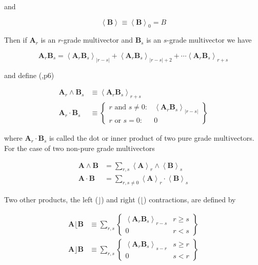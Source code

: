 \documentclass[12pt]{report}
\newcommand{\bm}[1]{\boldsymbol{#1}}
\newcommand{\llt}{\left <}
\newcommand{\rgt}{\right >}
\newcommand{\abs}[1]{\left |{#1}\right |}
\newcommand{\W}{\wedge}
\newcommand{\proj}[2]{\llt {#1} \rgt_{#2}}
\newcommand{\braces}[1]{\left \{ {#1} \right \}}
\begin{document}
and

   \begin{equation}
      \proj{\bm{B}}{} \equiv \proj{\bm{B}}{0} = B
   \end{equation}

Then if $\bm{A}_{r}$ is an $r$-grade multivector and $\bm{B}_{s}$ is an $s$-grade multivector we have

   \begin{equation}
      \bm{A}_{r}\bm{B}_{s} = \proj{\bm{A}_{r}\bm{B}_{s}}{\abs{r-s}}+\proj{\bm{A}_{r}\bm{B}_{s}}{\abs{r-s}+2}+\cdots
                             \proj{\bm{A}_{r}\bm{B}_{s}}{r+s}
   \end{equation}

and define (\cite{Hestenes},p6)

   \begin{align}
      \bm{A}_{r}\W\bm{B}_{s} &\equiv \proj{\bm{A}_{r}\bm{B}_{s}}{r+s} \\
      \bm{A}_{r}\cdot\bm{B}_{s} &\equiv \braces{ \begin{array}{cc}
      r\mbox{ and }s \ne 0: & \proj{\bm{A}_{r}\bm{B}_{s}}{\abs{r-s}}  \\
      r\mbox{ or }s = 0: & 0 \end{array}}
   \end{align}

where $\bm{A}_{r}\cdot\bm{B}_{s}$ is called the dot or inner product of
two pure grade multivectors.  For the case of two non-pure grade multivectors

   \begin{align}
      \bm{A}\W\bm{B} &= \sum_{r,s}\proj{\bm{A}}{r}\W\proj{\bm{B}}{{s}} \\
      \bm{A}\cdot\bm{B} &= \sum_{r,s\ne 0}\proj{\bm{A}}{r}\cdot\proj{\bm{B}}{{s}}
   \end{align}

Two other products, the left ($\rfloor$) and right ($\lfloor$) contractions, are defined by

   \begin{align}
      \bm{A}\lfloor\bm{B} &\equiv \sum_{r,s}\braces{\begin{array}{cc} \proj{\bm{A}_r\bm{B}_{s}}{r-s} & r \ge s \\
                                                  0                                               & r < s \end{array}}  \\
      \bm{A}\rfloor\bm{B} &\equiv \sum_{r,s}\braces{\begin{array}{cc} \proj{\bm{A}_{r}\bm{B}_{s}}{s-r} & s \ge r \\
                                                  0                                               & s < r\end{array}}
   \end{align}
\end{document}
